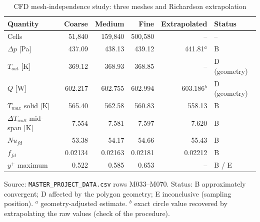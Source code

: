 \begin{table}[htbp]
\centering
\footnotesize
\caption{CFD mesh-independence study: three meshes and Richardson extrapolation}
\label{tab:mi}
\begin{tabular}{lrrrrl}
\toprule
Quantity & Coarse & Medium & Fine & Extrapolated & Status \\
\midrule
Cells & 51,840 & 159,840 & 500,580 & -- & -- \\
$\Delta p$ [Pa] & 437.09 & 438.13 & 439.12 & 441.81$^a$ & B \\
$T_{out}$ [K] & 369.12 & 368.93 & 368.85 & -- & D (geometry) \\
$Q$ [W] & 602.217 & 602.755 & 602.994 & 603.186$^b$ & D (geometry) \\
$T_{max}$ solid [K] & 565.40 & 562.58 & 560.83 & 558.13 & B \\
$\Delta T_{wall}$ mid-span [K] & 7.554 & 7.581 & 7.597 & 7.620 & B \\
$Nu_{fd}$ & 53.38 & 54.17 & 54.66 & 55.43 & B \\
$f_{fd}$ & 0.02134 & 0.02163 & 0.02181 & 0.02212 & B \\
$y^+$ maximum & 0.522 & 0.585 & 0.653 & -- & B / E \\
\bottomrule
\end{tabular}
\par\smallskip\parbox{\linewidth}{\footnotesize\raggedright Source: \texttt{MASTER\_PROJECT\_DATA.csv} rows M033--M070. Status: B approximately convergent; D affected by the polygon geometry; E inconclusive (sampling position). $^a$ geometry-adjusted estimate. $^b$ exact circle value recovered by extrapolating the raw values (check of the procedure).}
\end{table}
